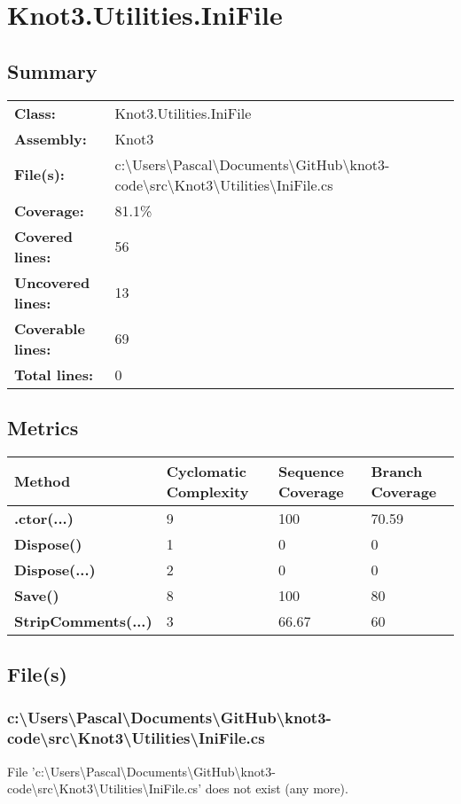 \documentclass[a4paper,10pt]{article}
\begin{document}
\section{Knot3.Utilities.IniFile}
\subsection{Summary}
\begin{longtable}[l]{ll}
\textbf{Class:} & Knot3.Utilities.IniFile\\
\textbf{Assembly:} & Knot3\\
\textbf{File(s):} & \begin{minipage}[t]{12cm}{c:\textbackslash Users\textbackslash Pascal\textbackslash Documents\textbackslash GitHub\textbackslash knot3-code\textbackslash src\textbackslash Knot3\textbackslash Utilities\textbackslash IniFile.cs}\end{minipage} \\
\textbf{Coverage:} & 81.1\%\\
\textbf{Covered lines:} & 56\\
\textbf{Uncovered lines:} & 13\\
\textbf{Coverable lines:} & 69\\
\textbf{Total lines:} & 0\\
\end{longtable}
\subsection{Metrics}
\begin{longtable}[l]{|l|l|l|l|}
\hline
\textbf{Method} & \textbf{Cyclomatic Complexity} & \textbf{Sequence Coverage} & \textbf{Branch Coverage}\\
\hline
\textbf{.ctor(...)} & 9 & 100 & 70.59\\
\hline
\textbf{Dispose()} & 1 & 0 & 0\\
\hline
\textbf{Dispose(...)} & 2 & 0 & 0\\
\hline
\textbf{Save()} & 8 & 100 & 80\\
\hline
\textbf{StripComments(...)} & 3 & 66.67 & 60\\
\hline
\end{longtable}
\subsection{File(s)}
\subsubsection{c:\textbackslash Users\textbackslash Pascal\textbackslash Documents\textbackslash GitHub\textbackslash knot3-code\textbackslash src\textbackslash Knot3\textbackslash Utilities\textbackslash IniFile.cs}
 File 'c:\textbackslash Users\textbackslash Pascal\textbackslash Documents\textbackslash GitHub\textbackslash knot3-code\textbackslash src\textbackslash Knot3\textbackslash Utilities\textbackslash IniFile.cs' does not exist (any more).
\newpage
\end{document}
